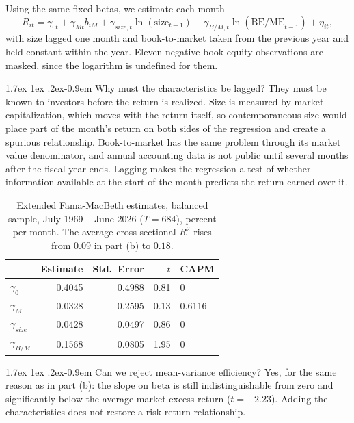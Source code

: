 \documentclass[11pt]{article}
\makeatletter
\renewcommand\paragraph{\@startsection{paragraph}{4}{0pt}%
  {1.7ex \@plus 1ex \@minus .2ex}{-0.9em}%
  {\normalfont\bfseries\normalsize\color{psink}}}
\makeatother
\begin{document}
Using the same fixed betas, we estimate each month
\[
R_{it} = \gamma_{0t} + \gamma_{Mt} b_{iM}
+ \gamma_{size,t}\ln(\text{size}_{t-1})
+ \gamma_{B/M,t}\ln(\text{BE/ME}_{t-1}) + \eta_{it},
\]
with size lagged one month and book-to-market taken from the previous year and
held constant within the year. Eleven negative book-equity observations are
masked, since the logarithm is undefined for them.

\paragraph{Why must the characteristics be lagged?} They must be known to
investors before the return is realized. Size is measured by market
capitalization, which moves with the return itself, so contemporaneous size
would place part of the month's return on both sides of the regression and
create a spurious relationship. Book-to-market has the same problem through its
market value denominator, and annual accounting data is not public until
several months after the fiscal year ends. Lagging makes the regression a test
of whether information available at the start of the month predicts the return
earned over it.

\begin{table}[H]
\centering
\caption{Extended Fama-MacBeth estimates, balanced sample, July 1969 -- June
2026 ($T = 684$), percent per month. The average cross-sectional $R^2$ rises
from $0.09$ in part (b) to $0.18$.}
\small
\begin{tabular}{lrrrl}
\toprule
& Estimate & Std.\ Error & $t$ & CAPM \\
\midrule
$\gamma_0$        & 0.4045 & 0.4988 & 0.81 & 0 \\
$\gamma_M$        & 0.0328 & 0.2595 & 0.13 & 0.6116 \\
$\gamma_{size}$   & 0.0428 & 0.0497 & 0.86 & 0 \\
$\gamma_{B/M}$    & 0.1568 & 0.0805 & 1.95 & 0 \\
\bottomrule
\end{tabular}
\label{tab:fmbext}
\end{table}

\paragraph{Can we reject mean-variance efficiency?} Yes, for the same reason as
in part (b): the slope on beta is still indistinguishable from zero and
significantly below the average market excess return ($t = -2.23$). Adding the
characteristics does not restore a risk-return relationship.
\end{document}
